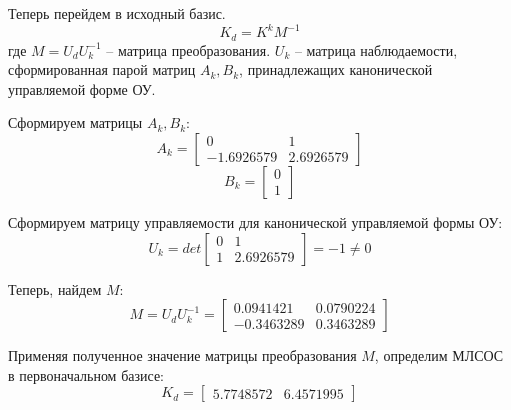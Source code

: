 \documentclass[a4paper,14pt]{extreport}
\begin{document}
	Теперь перейдем в исходный базис.
	\begin{equation}
	K_d = K^k M^{-1}
	\end{equation}
	где $M = U_d U_k^{-1}$ -- матрица преобразования.
	$U_k$ -- матрица наблюдаемости, сформированная парой матриц $A_k, B_k$, принадлежащих канонической управляемой форме ОУ.
	
	Сформируем матрицы $A_k, B_k$:
	\begin{equation}
	A_k =
	\begin{bmatrix}
	0 & 1\\
	-1.6926579 & 2.6926579
	\end{bmatrix}
	\end{equation}
	\begin{equation}
	B_k = \begin{bmatrix}
	0\\
	1
	\end{bmatrix}
	\end{equation}
	
	Сформируем матрицу управляемости для канонической управляемой формы ОУ:
	\begin{equation}
	U_k =det
	\begin{bmatrix}
	0&1\\
	1&2.6926579
	\end{bmatrix}
	=- 1  \ne 0
	\end{equation}
	
	Теперь, найдем $M$:
	\begin{equation}
	M = U_d U_k^{-1} =
	\begin{bmatrix}
	0.0941421  &  0.0790224  \\
	- 0.3463289   & 0.3463289  
	\end{bmatrix}
	\end{equation}
	
	Применяя полученное значение матрицы преобразования $M$, определим МЛСОС в первоначальном базисе:
	\begin{equation}
	K_d = 
	\begin{bmatrix}
	5.7748572    &6.4571995 
	\end{bmatrix}
	\end{equation}
	
\end{document}

